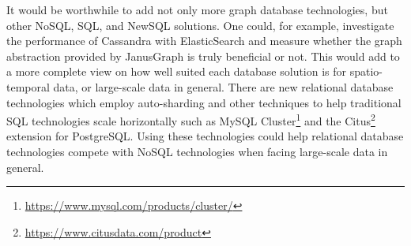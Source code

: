 It would be worthwhile to add not only more graph database technologies, but other NoSQL, SQL, and NewSQL solutions. One could, for example, investigate the performance of Cassandra with ElasticSearch and measure whether the graph abstraction provided by JanusGraph is truly beneficial or not. This would add to a more complete view on how well suited each database solution is for spatio-temporal data, or large-scale data in general. There are new relational database technologies which employ auto-sharding and other techniques to help traditional SQL technologies scale horizontally such as MySQL Cluster\footnote{\url{https://www.mysql.com/products/cluster/}} and the Citus\footnote{\url{https://www.citusdata.com/product}} extension for PostgreSQL. Using these technologies could help relational database technologies compete with NoSQL technologies when facing large-scale data in general.
